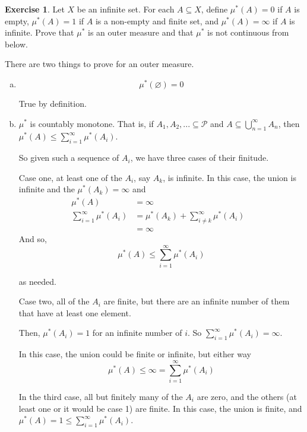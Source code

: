 \documentclass[11pt,oneside]{article}
\numberwithin{equation}{section}
\theoremstyle{definition}
\newtheorem{exercise}{Exercise}
\begin{document}
\begin{exercise}
  Let $X$ be an infinite set.  For each $A \subseteq X$,
  define $\mu^* (A) = 0$ if $A$ is empty, $\mu^*(A) = 1$ if
  $A$ is a non-empty and finite set, and $\mu^*(A) = \infty$
  if $A$ is infinite.  Prove that $\mu^*$ is an
  outer measure and that $\mu^*$ is not continuous from below.
\end{exercise}
\begin{solution}
  There are two things to prove for an outer measure.
  \begin{enumerate}[(a)]
    \item
      $$
      \mu ^ *(\varnothing) = 0
      $$

    True by definition.
    \item
      $      \mu ^ * $ is countably monotone.  That is, if $A_1, A_2, ... \subseteq \mathcal{P}$ and
      $A \subseteq \bigcup \limits _ {n=1} ^ {\infty} A_n$, then
      $\mu ^ * (A) \leq \sum \limits _ {i=1} ^ {\infty} \mu ^* ( A_i)$.

      So given such a sequence of $A_i$, we have three cases of their finitude.

      Case one, at least one of the $A_i$, say $A_k$, is infinite.  In this case,
      the union is infinite and the $\mu ^ * (A_k) = \infty$ and
      \begin{align*}
        \mu ^ * (A) &= \infty  & \\
        \sum \limits _ {i=1} ^ {\infty} \mu ^* ( A_i) &= \mu ^* (A_k) + \sum _{i\neq k} ^ \infty \mu ^*  (A_i) & \\
        & = \infty  &
      \end{align*}
      And so,
      $$
      \mu ^ * (A) \leq   \sum \limits _ {i=1} ^ {\infty} \mu ^* ( A_i) 
      $$

      as needed.

      Case two, all of the $A_i$ are finite, but there are an infinite
      number of them that have at least one element.

      Then, $\mu ^*(A_i) = 1$ for an infinite number of $i$.  So
      $   \sum \limits _ {i=1} ^ {\infty} \mu ^* ( A_i) = \infty$.

      In this case, the union could be finite or infinite, but either way 
      $$
      \mu^* (A) \leq \infty =  \sum \limits _ {i=1} ^ {\infty} \mu ^* ( A_i)
      $$

      In the third case, all but finitely many of the $A_i$ are zero,
      and the others (at least one or it would be case 1) are finite.
      In this case, the union is finite, and $\mu^* (A) = 1 \leq \sum \limits _ {i=1} ^ {\infty} \mu ^* ( A_i)$.


\end{enumerate}
\end{solution}
\end{document}
